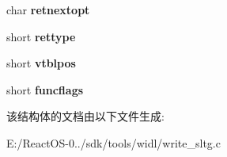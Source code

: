 \begin{DoxyCompactItemize}
char {\bfseries retnextopt}
\item 
\mbox{\label{structsltg__function_a67fa630ac1563d0299bf9d2cb88c13aa}} 
short {\bfseries rettype}
\item 
\mbox{\label{structsltg__function_a53860bf5f959a2dca52d0bc5309f8c13}} 
short {\bfseries vtblpos}
\item 
\mbox{\label{structsltg__function_a8971a4968105dad1bbcc81765fe970fc}} 
short {\bfseries funcflags}
\end{DoxyCompactItemize}


该结构体的文档由以下文件生成\+:\begin{DoxyCompactItemize}
\item 
E\+:/\+React\+O\+S-\/0../sdk/tools/widl/write\+\_\+sltg.\+c\end{DoxyCompactItemize}
